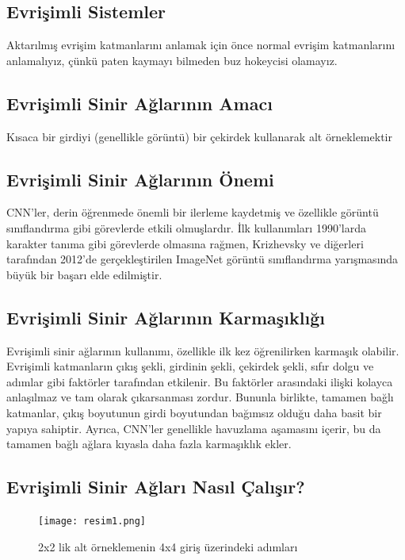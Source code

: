 \documentclass[10pt]{article}
\begin{document}
	\subsection{Evrişimli Sistemler }
	Aktarılmış evrişim katmanlarını anlamak için önce normal evrişim katmanlarını anlamalıyız, çünkü paten kaymayı bilmeden buz hokeycisi olamayız.
	
	
	\subsection{Evrişimli Sinir Ağlarının Amacı}
	Kısaca bir girdiyi (genellikle görüntü)  bir çekirdek kullanarak alt örneklemektir
	
	\subsection{Evrişimli Sinir Ağlarının Önemi}
	CNN'ler, derin öğrenmede önemli bir ilerleme kaydetmiş ve özellikle görüntü sınıflandırma gibi görevlerde etkili olmuşlardır. İlk kullanımları 1990'larda karakter tanıma gibi görevlerde olmasına rağmen, Krizhevsky ve diğerleri tarafından 2012'de gerçekleştirilen ImageNet görüntü sınıflandırma yarışmasında büyük bir başarı elde edilmiştir.\cite{youtube}
	
	\subsection{Evrişimli Sinir Ağlarının Karmaşıklığı}
	Evrişimli sinir ağlarının kullanımı, özellikle ilk kez öğrenilirken karmaşık olabilir. Evrişimli katmanların çıkış şekli, girdinin şekli, çekirdek şekli, sıfır dolgu ve adımlar gibi faktörler tarafından etkilenir. Bu faktörler arasındaki ilişki kolayca anlaşılmaz ve tam olarak çıkarsanması zordur. Bununla birlikte, tamamen bağlı katmanlar, çıkış boyutunun girdi boyutundan bağımsız olduğu daha basit bir yapıya sahiptir. Ayrıca, CNN'ler genellikle havuzlama aşamasını içerir, bu da tamamen bağlı ağlara kıyasla daha fazla karmaşıklık ekler.\cite{youtube}
	
	
	
	\subsection{Evrişimli Sinir Ağları Nasıl Çalışır?}
	\begin{figure}[htbp]
		\centering
		\texttt{[image: resim1.png]}
		\caption{ 2x2 lik alt örneklemenin 4x4 giriş üzerindeki adımları \cite{ytchannels}} 
		\label{fig:evrisim1}
	\end{figure}
	
\end{document}
